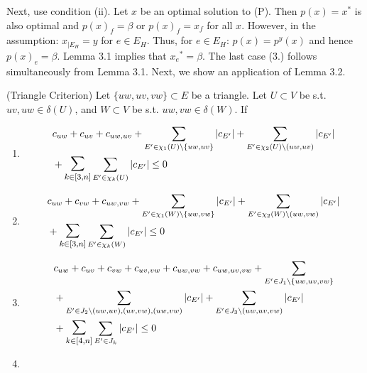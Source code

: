 Next, use condition (ii). Let $x$ be an optimal solution to (P). Then $p(x)=x^*$ is also optimal and $p(x)_f= \beta$ or $p(x)_f=x_f$ for all $x$. However, in the assumption: $x_{|E_H} = y$ for $e \in E_H$. Thus, for $e \in E_H$: $p(x)=p^y(x)$ and hence $p(x)_e=\beta$. Lemma 3.1 implies that ${x_e}^*=\beta$.
The last case (3.) follows simultaneously from Lemma 3.1. Next, we show an application of Lemma 3.2. 
\begin{theorem}{(Triangle Criterion)}
Let $\{uw,uv,vw\} \subset E$ be a triangle. Let $U \subset V$ be s.t. $uv, uw \in \delta(U)$, and $W \subset V$ be s.t. $uw,vw \in \delta(W)$. If 
\begin{enumerate}
\item \begin{equation*}
    \begin{split}
    & c_{uw}+c_{uv}+c_{uw,uv} + \sum_{E' \in \chi_1(U) \setminus \{uw,uv\} }|c_{E'}| + \sum_{E' \in \chi_2(U) \setminus (uw,uv)} |c_{E'}| \\ &+  \mathlarger{\mathlarger{\sum}}_{k \in [3,n]} \sum_{E' \in \chi_k(U)} |c_{E'}| \leq 0
    \end{split}
\end{equation*}
\item \begin{equation*}
    \begin{split}
    & c_{uw}+c_{vw}+c_{uw,vw} + \sum_{E' \in \chi_1(W) \setminus \{uw,vw\} }|c_{E'}| + \sum_{E' \in \chi_2(W) \setminus (uw,vw)} |c_{E'}| \\ & + \mathlarger{\mathlarger{\sum}}_{k \in [3,n]} \sum_{E' \in \chi_k(W)} |c_{E'}| \leq 0 
    \end{split}
\end{equation*}
\item 
\begin{equation*}
    \begin{split}
    & c_{uw}+c_{uv}+c_{vw}+c_{uv,vw}+c_{uw,vw}+c_{uw,uv,vw} + \sum_{E' \in J_1 \setminus \{uw,uv,vw\} }  \\  
    & + \sum_{E' \in J_2 \setminus (uw,uv),(uv,vw),(uw,vw)} |c_{E'}|+ \sum_{E' \in J_3 \setminus (uw,uv,vw)} |c_{E'}| \\ 
    & + \mathlarger{\mathlarger{\sum}}_{k \in [4,n]} \sum_{E' \in J_k} |c_{E'}| \leq 0
    \end{split}
\end{equation*}
\item \begin{equation*}
    \begin{split}

\end{split}
\end{equation*}
\end{enumerate}
\end{theorem}
